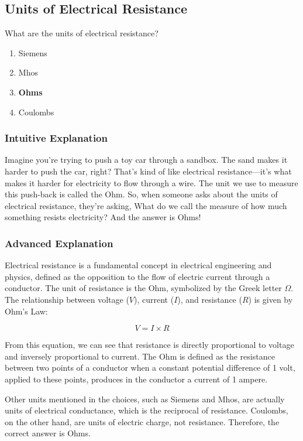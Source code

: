 \subsection{Units of Electrical Resistance}
\label{T5A04}

\begin{tcolorbox}[colback=gray!10!white,colframe=black!75!black,title=T5A04]
What are the units of electrical resistance?
\begin{enumerate}[label=\Alph*)]
    \item Siemens
    \item Mhos
    \item \textbf{Ohms}
    \item Coulombs
\end{enumerate}
\end{tcolorbox}

\subsubsection{Intuitive Explanation}
Imagine you're trying to push a toy car through a sandbox. The sand makes it harder to push the car, right? That's kind of like electrical resistance—it's what makes it harder for electricity to flow through a wire. The unit we use to measure this push-back is called the Ohm. So, when someone asks about the units of electrical resistance, they're asking, What do we call the measure of how much something resists electricity? And the answer is Ohms!

\subsubsection{Advanced Explanation}
Electrical resistance is a fundamental concept in electrical engineering and physics, defined as the opposition to the flow of electric current through a conductor. The unit of resistance is the Ohm, symbolized by the Greek letter $\Omega$. The relationship between voltage ($V$), current ($I$), and resistance ($R$) is given by Ohm's Law:

\[
V = I \times R
\]

From this equation, we can see that resistance is directly proportional to voltage and inversely proportional to current. The Ohm is defined as the resistance between two points of a conductor when a constant potential difference of 1 volt, applied to these points, produces in the conductor a current of 1 ampere.

Other units mentioned in the choices, such as Siemens and Mhos, are actually units of electrical conductance, which is the reciprocal of resistance. Coulombs, on the other hand, are units of electric charge, not resistance. Therefore, the correct answer is Ohms.

